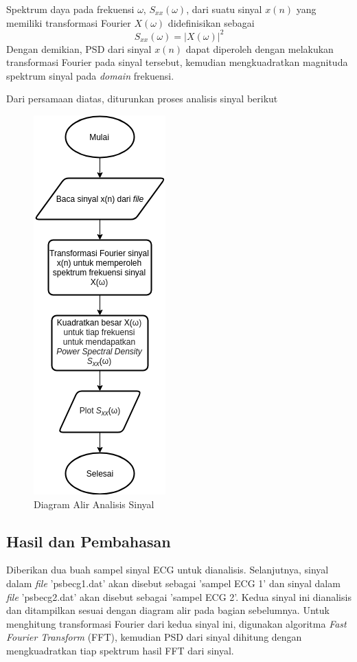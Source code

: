 \documentclass[11pt]{article}
\begin{document}
Spektrum daya pada frekuensi $\omega$, $S_{xx}(\omega)$, dari suatu sinyal $x(n)$ yang memiliki transformasi Fourier $X(\omega)$ didefinisikan sebagai
\begin{equation}
    S_{xx}(\omega) = |X(\omega)|^2
\end{equation}
Dengan demikian, PSD dari sinyal $x(n)$ dapat diperoleh dengan melakukan transformasi Fourier pada sinyal tersebut, kemudian mengkuadratkan magnituda spektrum sinyal pada \textit{domain} frekuensi.

Dari persamaan diatas, diturunkan proses analisis sinyal berikut
\begin{figure}[H]
\centerline{\includegraphics[scale=0.6]{figures/fig4-diagramalirtopik1.png}}
\caption{Diagram Alir Analisis Sinyal}
\end{figure}

\subsection{Hasil dan Pembahasan}
Diberikan dua buah sampel sinyal ECG untuk dianalisis. Selanjutnya, sinyal dalam \textit{file} 'psb\textunderscore ecg1.dat' akan disebut sebagai 'sampel ECG 1' dan sinyal dalam \textit{file} 'psb\textunderscore ecg2.dat' akan disebut sebagai 'sampel ECG 2'. Kedua sinyal ini dianalisis dan ditampilkan sesuai dengan diagram alir pada bagian sebelumnya. Untuk menghitung transformasi Fourier dari kedua sinyal ini, digunakan algoritma \textit{Fast Fourier Transform} (FFT), kemudian PSD dari sinyal dihitung dengan mengkuadratkan tiap spektrum hasil FFT dari sinyal.
\end{document}
